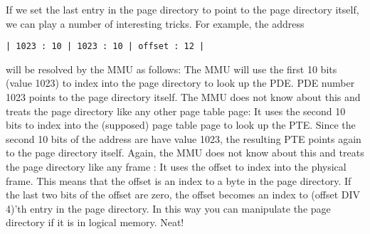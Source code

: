 \documentclass[letterpaper,11pt]{article}
\begin{document}
If we set the last entry in the page directory to point to the
page directory itself, we can play a number of interesting tricks. For
example, the address 
\begin{center}
{\tt | 1023 : 10 | 1023 : 10 | offset : 12 |}
\end{center}
will be resolved by the MMU as follows: The MMU will use the first 10
bits (value 1023) to index into the page directory to look up the
PDE. PDE number 1023 points to the page directory itself. The MMU does
not know about this and treats the page directory like any other page
table page: It uses the second 10 bits to index into the (supposed)
page table page to look up the PTE. Since the second 10 bits of the
address are have value 1023, the resulting PTE points again to the
page directory itself. Again, the MMU does not know about this and
treats the page directory like any frame : It uses the offset to index
into the physical frame. This means that the offset is an index to a
byte in the page directory. If the last two bits of the offset are
zero, the offset becomes an index to (offset DIV 4)'th entry in the
page directory. In this way you can manipulate the page directory if
it is in logical memory. Neat!
\end{document}
